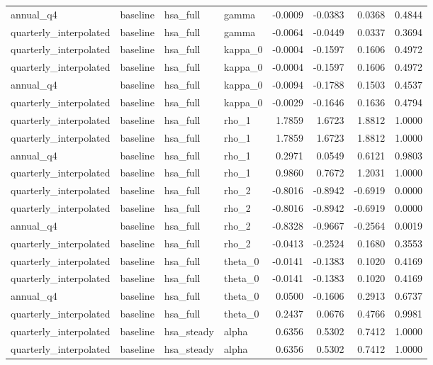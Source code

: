 \begin{tabular}{llllrrrr}
annual\_q4 & baseline & hsa\_full & gamma & -0.0009 & -0.0383 & 0.0368 & 0.4844 \\
quarterly\_interpolated & baseline & hsa\_full & gamma & -0.0064 & -0.0449 & 0.0337 & 0.3694 \\
quarterly\_interpolated & baseline & hsa\_full & kappa\_0 & -0.0004 & -0.1597 & 0.1606 & 0.4972 \\
quarterly\_interpolated & baseline & hsa\_full & kappa\_0 & -0.0004 & -0.1597 & 0.1606 & 0.4972 \\
annual\_q4 & baseline & hsa\_full & kappa\_0 & -0.0094 & -0.1788 & 0.1503 & 0.4537 \\
quarterly\_interpolated & baseline & hsa\_full & kappa\_0 & -0.0029 & -0.1646 & 0.1636 & 0.4794 \\
quarterly\_interpolated & baseline & hsa\_full & rho\_1 & 1.7859 & 1.6723 & 1.8812 & 1.0000 \\
quarterly\_interpolated & baseline & hsa\_full & rho\_1 & 1.7859 & 1.6723 & 1.8812 & 1.0000 \\
annual\_q4 & baseline & hsa\_full & rho\_1 & 0.2971 & 0.0549 & 0.6121 & 0.9803 \\
quarterly\_interpolated & baseline & hsa\_full & rho\_1 & 0.9860 & 0.7672 & 1.2031 & 1.0000 \\
quarterly\_interpolated & baseline & hsa\_full & rho\_2 & -0.8016 & -0.8942 & -0.6919 & 0.0000 \\
quarterly\_interpolated & baseline & hsa\_full & rho\_2 & -0.8016 & -0.8942 & -0.6919 & 0.0000 \\
annual\_q4 & baseline & hsa\_full & rho\_2 & -0.8328 & -0.9667 & -0.2564 & 0.0019 \\
quarterly\_interpolated & baseline & hsa\_full & rho\_2 & -0.0413 & -0.2524 & 0.1680 & 0.3553 \\
quarterly\_interpolated & baseline & hsa\_full & theta\_0 & -0.0141 & -0.1383 & 0.1020 & 0.4169 \\
quarterly\_interpolated & baseline & hsa\_full & theta\_0 & -0.0141 & -0.1383 & 0.1020 & 0.4169 \\
annual\_q4 & baseline & hsa\_full & theta\_0 & 0.0500 & -0.1606 & 0.2913 & 0.6737 \\
quarterly\_interpolated & baseline & hsa\_full & theta\_0 & 0.2437 & 0.0676 & 0.4766 & 0.9981 \\
quarterly\_interpolated & baseline & hsa\_steady & alpha & 0.6356 & 0.5302 & 0.7412 & 1.0000 \\
quarterly\_interpolated & baseline & hsa\_steady & alpha & 0.6356 & 0.5302 & 0.7412 & 1.0000 \\

\end{tabular}
